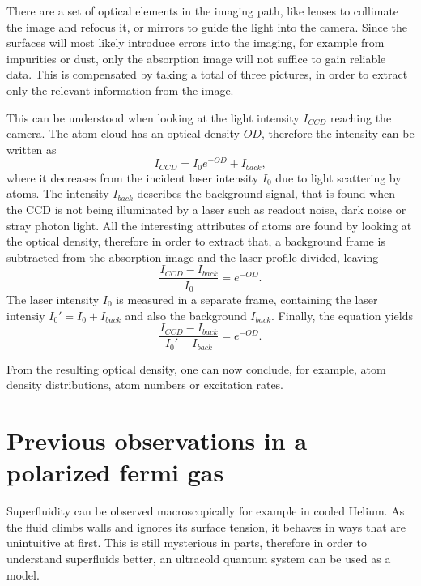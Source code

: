 
There are a set of optical elements in the imaging path, like lenses to collimate the image and refocus it, or mirrors to guide the light into the camera. Since the surfaces will most likely introduce errors into the imaging, for example from impurities or dust, only the absorption image will not suffice to gain reliable data. This is compensated by taking a total of three pictures, in order to extract only the relevant information from the image.

This can be understood when looking at the light intensity $I_{CCD}$ reaching the camera. The atom cloud has an optical density $OD$, therefore the intensity can be written as
\begin{equation}
I_{CCD} = I_0 e^{-OD} + I_{back},
\end{equation}
where it decreases from the incident laser intensity $I_0$ due to light scattering by atoms. The intensity $I_{back}$ describes the background signal, that is found when the CCD is not being illuminated by a laser such as readout noise, dark noise or stray photon light. All the interesting attributes of atoms are found by looking at the optical density, therefore in order to extract that, a background frame is subtracted from the absorption image and the laser profile divided, leaving
\begin{equation}
\frac{I_{CCD} - I_{back}}{I_0} = e^{-OD}.
\end{equation}
The laser intensity $I_0$ is measured in a separate frame, containing the laser intensiy $I_0' = I_0 + I_{back}$ and also the background $I_{back}$. Finally, the equation yields
\begin{equation}
\frac{I_{CCD} - I_{back}}{I_0' - I_{back}} = e^{-OD}.
\end{equation}

From the resulting optical density, one can now conclude, for example, atom density distributions, atom numbers or excitation rates.

\iffalse
\section{Previous observations in a polarized fermi gas}

Superfluidity can be observed macroscopically for example in cooled Helium. As the fluid climbs walls and ignores its surface tension, it behaves in ways that are unintuitive at first. This is still mysterious in parts, therefore in order to understand superfluids better, an ultracold quantum system can be used as a model.


